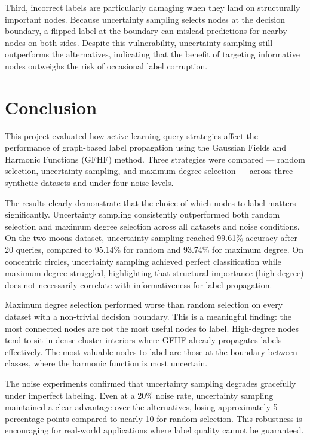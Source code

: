 \documentclass{article}
\begin{document}
Third, incorrect labels are particularly damaging when they land on structurally important nodes. Because uncertainty sampling selects nodes at the decision boundary, a flipped label at the boundary can mislead predictions for nearby nodes on both sides. Despite this vulnerability, uncertainty sampling still outperforms the alternatives, indicating that the benefit of targeting informative nodes outweighs the risk of occasional label corruption.


\section{Conclusion}

This project evaluated how active learning query strategies affect the performance of graph-based label propagation using the Gaussian Fields and Harmonic Functions (GFHF) method. Three strategies were compared --- random selection, uncertainty sampling, and maximum degree selection --- across three synthetic datasets and under four noise levels.

The results clearly demonstrate that the choice of which nodes to label matters significantly. Uncertainty sampling consistently outperformed both random selection and maximum degree selection across all datasets and noise conditions. On the two moons dataset, uncertainty sampling reached 99.61\% accuracy after 20 queries, compared to 95.14\% for random and 93.74\% for maximum degree. On concentric circles, uncertainty sampling achieved perfect classification while maximum degree struggled, highlighting that structural importance (high degree) does not necessarily correlate with informativeness for label propagation.

Maximum degree selection performed worse than random selection on every dataset with a non-trivial decision boundary. This is a meaningful finding: the most connected nodes are not the most useful nodes to label. High-degree nodes tend to sit in dense cluster interiors where GFHF already propagates labels effectively. The most valuable nodes to label are those at the boundary between classes, where the harmonic function is most uncertain.

The noise experiments confirmed that uncertainty sampling degrades gracefully under imperfect labeling. Even at a 20\% noise rate, uncertainty sampling maintained a clear advantage over the alternatives, losing approximately 5 percentage points compared to nearly 10 for random selection. This robustness is encouraging for real-world applications where label quality cannot be guaranteed.
\end{document}
